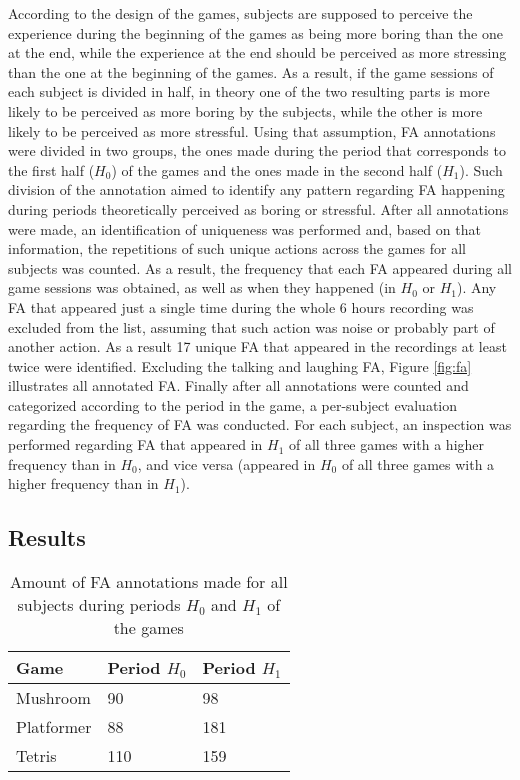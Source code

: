 According to the design of the games, subjects are supposed to perceive the experience during the beginning of the games as being more boring than the one at the end, while the experience at the end should be perceived as more stressing than the one at the beginning of the games. As a result, if the game sessions of each subject is divided in half, in theory one of the two resulting parts is more likely to be perceived as more boring by the subjects, while the other is more likely to be perceived as more stressful. Using that assumption, FA annotations were divided in two groups, the ones made during the period that corresponds to the first half ($H_0$) of the games and the ones made in the second half ($H_1$). Such division of the annotation aimed to identify any pattern regarding FA happening during periods theoretically perceived as boring or stressful. After all annotations were made, an identification of uniqueness was performed and, based on that information, the repetitions of such unique actions across the games for all subjects was counted. As a result, the frequency that each FA appeared during all game sessions was obtained, as well as when they happened (in $H_0$ or $H_1$). Any FA that appeared just a single time during the whole 6 hours recording was excluded from the list, assuming that such action was noise or probably part of another action. As a result 17 unique FA that appeared in the recordings at least twice were identified. Excluding the talking and laughing FA, Figure \ref{fig:fa} illustrates all annotated FA. Finally after all annotations were counted and categorized according to the period in the game, a per-subject evaluation regarding the frequency of FA was conducted. For each subject, an inspection was performed regarding FA that appeared in $H_1$ of all three games with a higher frequency than in $H_0$, and vice versa (appeared in $H_0$ of all three games with a higher frequency than in $H_1$).

\subsection{Results}

\begin{table}[h!]
\caption{Amount of FA annotations made for all subjects during periods $H_0$ and $H_1$ of the games}
\label{table:amount-fa}
\centering
\begin{tabular}{L{.4\linewidth}C{.2\linewidth}C{.2\linewidth}}%
\toprule%
\textbf{Game} & \textbf{Period $H_0$} & \textbf{Period $H_1$} \\
\midrule
Mushroom   & 90 & 98 \\
\midrule
Platformer & 88 & 181 \\
\midrule
Tetris     & 110 & 159 \\
\bottomrule%
\end{tabular}%
\end{table}


